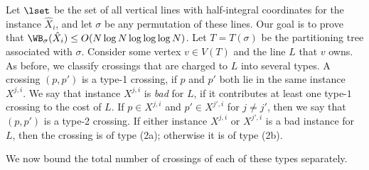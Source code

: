\documentclass{toc}
\begin{document}
Let $\lset$ be the set of all vertical lines with half-integral  coordinates for the instance $\hat X_i$, and let $\sigma$ be any permutation of these lines. Our goal is to prove that $\WB_{\sigma}(\hat X_i)\leq O(N\log N\log\log\log N)$. Let $T=T(\sigma)$ be the partitioning tree associated with $\sigma$. Consider some vertex $v\in V(T)$ and the line $L$ that $v$ owns. As before, we classify crossings that are charged to $L$ into several types. A crossing $(p,p')$ is a type-1 crossing, if $p$ and $p'$ both lie in the same instance $X^{j,i}$. We say that instance $X^{j,i}$ is \emph{bad} for $L$, if it contributes at least one type-$1$ crossing to the cost of $L$. If $p\in X^{j,i}$ and $p'\in X^{j',i}$ for $j\neq j'$, then we say that $(p,p')$ is a type-2 crossing. If either instance $X^{j,i}$ or $X^{j',i}$ is a bad instance for $L$, then the crossing is of type (2a); otherwise it is of type (2b). 

We now bound the total number of crossings of each of these types separately.
\end{document}
